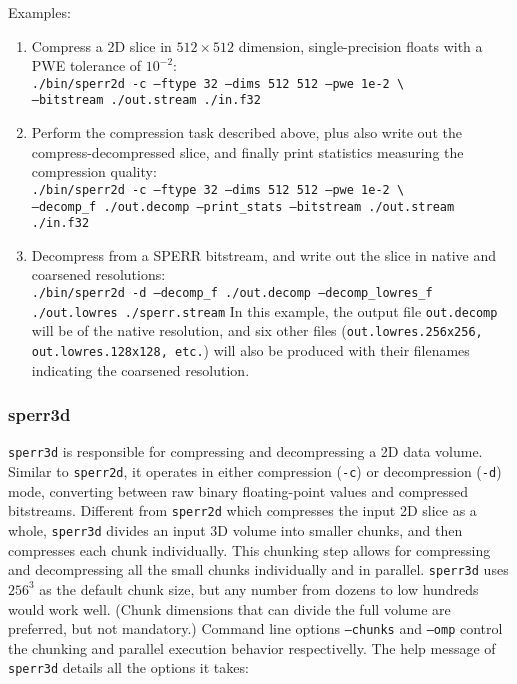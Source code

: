 \documentclass{article}
\begin{document}
Examples:
\begin{enumerate}
\item Compress a 2D slice in $512\times512$ dimension, single-precision floats
      with a PWE tolerance of $10^{-2}$: \\ 
      \texttt{./bin/sperr2d -c --ftype 32 --dims 512 512  --pwe 1e-2 
              \textbackslash \\
               --bitstream ./out.stream ./in.f32}

\item Perform the compression task described above, plus also write out the 
      compress-decompressed slice, and finally print statistics
      measuring the compression quality: \\
      \texttt{./bin/sperr2d -c --ftype 32 --dims 512 512  --pwe 1e-2
               \textbackslash \\
               --decomp\_f ./out.decomp --print\_stats
               --bitstream ./out.stream ./in.f32}

\item Decompress from a SPERR bitstream, and write out the slice in native 
      and coarsened resolutions: \\
      \texttt{./bin/sperr2d -d --decomp\_f ./out.decomp --decomp\_lowres\_f ./out.lowres 
              ./sperr.stream}
      In this example, the output file \texttt{out.decomp} will be of the native resolution, 
      and six other files (\texttt{out.lowres.256x256, out.lowres.128x128, etc.}) 
      will also be produced with their filenames indicating the coarsened resolution.
\end{enumerate}

\subsubsection{sperr3d}
\label{sec:sperr3d}
\texttt{sperr3d} is responsible for compressing and decompressing a 2D data volume.
Similar to \texttt{sperr2d}, it operates in either compression (\texttt{-c}) or 
decompression (\texttt{-d}) mode, converting between raw binary floating-point values 
and compressed bitstreams. 
Different from \texttt{sperr2d} which compresses the input 2D slice as a whole, 
\texttt{sperr3d} divides an input 3D volume into smaller chunks, and then compresses
each chunk individually.
This chunking step allows for compressing and decompressing all the small chunks 
individually and in parallel.
\texttt{sperr3d} uses $256^3$ as the default chunk size, but any number from dozens to
low hundreds would work well.
(Chunk dimensions that can divide the full volume are preferred, but not mandatory.)
Command line options \texttt{--chunks} and \texttt{--omp} control the chunking and 
parallel execution behavior respectivelly.
The help message of \texttt{sperr3d} details all the options it takes:
\end{document}
